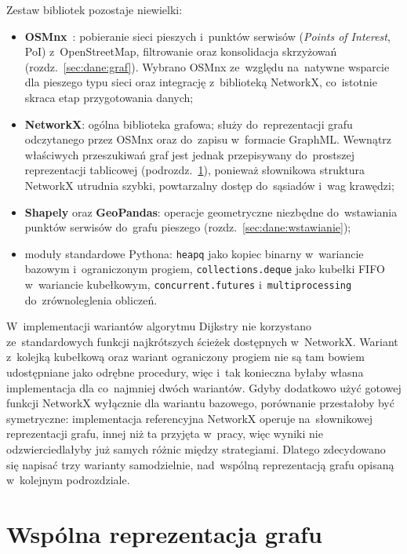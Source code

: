 Zestaw bibliotek pozostaje niewielki:
\begin{itemize}
  \item \textbf{OSMnx}~\cite{boeing2017osmnx}: pobieranie sieci pieszych
        i~punktów serwisów (\emph{Points of Interest}, PoI) z~OpenStreetMap, filtrowanie
        oraz konsolidacja skrzyżowań (rozdz.~\ref{sec:dane:graf}).
        Wybrano OSMnx ze~względu na~natywne wsparcie dla pieszego typu sieci
        oraz integrację z~biblioteką NetworkX,
        co~istotnie skraca etap przygotowania danych;
  \item \textbf{NetworkX}: ogólna biblioteka grafowa;
  służy do~reprezentacji grafu odczytanego przez OSMnx
  oraz do~zapisu w~formacie GraphML. Wewnątrz właściwych przeszukiwań
  graf jest jednak przepisywany do~prostszej reprezentacji tablicowej
  (podrozdz.~\ref{sec:impl:reprezentacja}), ponieważ słownikowa struktura
  NetworkX utrudnia szybki, powtarzalny dostęp do~sąsiadów
        i~wag krawędzi;
  \item \textbf{Shapely} oraz \textbf{GeoPandas}: operacje geometryczne
        niezbędne do~wstawiania punktów serwisów do~grafu pieszego
        (rozdz.~\ref{sec:dane:wstawianie});
  \item moduły standardowe Pythona: \texttt{heapq} jako kopiec binarny
        w~wariancie bazowym i~ograniczonym progiem, \texttt{collections.deque}
        jako kubełki FIFO w~wariancie kubełkowym, \texttt{concurrent.futures}
        i~\texttt{multiprocessing} do~zrównoleglenia obliczeń.
\end{itemize}

W~implementacji wariantów algorytmu Dijkstry nie korzystano ze~standardowych
funkcji najkrótszych ścieżek dostępnych w~NetworkX. Wariant z~kolejką kubełkową
oraz wariant ograniczony progiem nie są tam bowiem udostępniane jako odrębne
procedury, więc i~tak konieczna byłaby własna implementacja dla co~najmniej
dwóch wariantów. Gdyby dodatkowo użyć gotowej funkcji NetworkX wyłącznie dla
wariantu bazowego, porównanie przestałoby być symetryczne: implementacja
referencyjna NetworkX operuje na~słownikowej reprezentacji grafu, innej niż ta
przyjęta w~pracy, więc wyniki nie odzwierciedlałyby już samych różnic między strategiami.
Dlatego zdecydowano się napisać trzy warianty samodzielnie, nad~wspólną reprezentacją
grafu opisaną w~kolejnym podrozdziale.

\section{Wspólna reprezentacja grafu}
\label{sec:impl:reprezentacja}

